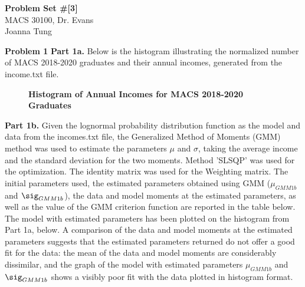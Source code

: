 \documentclass[letterpaper,12pt]{article}
\theoremstyle{definition}
\begin{document}
\begin{flushleft}
  \textbf{\large{Problem Set \#[3]}} \\
  MACS 30100, Dr. Evans \\
  Joanna Tung
\end{flushleft}

\vspace{5mm}

\noindent\textbf{Problem 1}
\noindent\newline\textbf{Part 1a. }Below is the histogram illustrating the normalized number of MACS 2018-2020 graduates and their annual incomes, generated from the income.txt file.

\begin{figure}[htb]\centering\captionsetup{width=4.0in}
  \caption{\textbf{Histogram of Annual Incomes for MACS 2018-2020 Graduates}}\label{FigPS3_1a}
\end{figure}

\noindent\newline\textbf{Part 1b.} Given the lognormal probability distribution function as the model and data from the incomes.txt file, the Generalized Method of Moments (GMM) method was used to estimate the parameters $\mu$ and $\sigma$, taking the average income and the standard deviation for the two moments. Method 'SLSQP' was used for the optimization. The identity matrix was used for the Weighting matrix. The initial parameters used, the estimated parameters obtained using GMM ($\mu_{GMM1b}$ and $\sig_{GMM1b}$), the data and model moments at the estimated parameters, as well as the value of the GMM criterion function are reported in the table below. The model with estimated parameters has been plotted on the histogram from Part 1a, below. A comparison of the data and model moments at the estimated parameters suggests that the estimated parameters returned do not offer a good fit for the data: the mean of the data and model moments are considerably dissimilar, and the graph of the model with estimated parameters $\mu_{GMM1b}$ and $\sig_{GMM1b}$ shows a visibly poor fit with the data plotted in histogram format.
\end{document}
